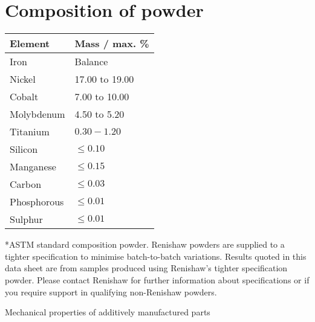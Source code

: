 \documentclass[10pt]{article}
\begin{document}
\section*{Composition of powder}
\begin{center}
\begin{tabular}{|l|l|}
\hline
Element & Mass / max. \% \\
\hline
Iron & Balance \\
\hline
Nickel & 17.00 to 19.00 \\
\hline
Cobalt & 7.00 to 10.00 \\
\hline
Molybdenum & 4.50 to 5.20 \\
\hline
Titanium & $0.30-1.20$ \\
\hline
Silicon & $\leq 0.10$ \\
\hline
Manganese & $\leq 0.15$ \\
\hline
Carbon & $\leq 0.03$ \\
\hline
Phosphorous & $\leq 0.01$ \\
\hline
Sulphur & $\leq 0.01$ \\
\hline
\end{tabular}
\end{center}

*ASTM standard composition powder. Renishaw powders are supplied to a tighter specification to minimise batch-to-batch variations. Results quoted in this data sheet are from samples produced using Renishaw's tighter specification powder. Please contact Renishaw for further information about specifications or if you require support in qualifying non-Renishaw powders.

Mechanical properties of additively manufactured parts
\end{document}
